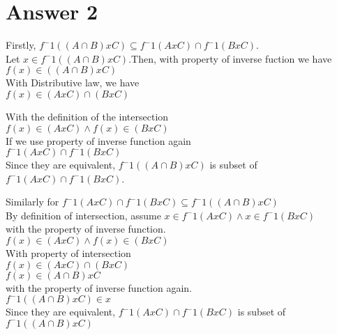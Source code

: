 \documentclass[12pt]{article}
\begin{document}
\section*{Answer 2}

Firstly, $f^-1((A \cap B)xC) \subseteq f^-1(AxC) \cap f^-1(BxC)$. \\

Let $x \in f^-1((A \cap B)xC)$.Then, with property of inverse fuction we have \\


$f(x) \in ((A \cap B)xC)$ \\ 

With Distributive law, we have \\

$f(x) \in (AxC)  \cap (BxC)$ 

With the definition of the intersection \\

$f(x) \in (AxC) \land f(x) \in  (BxC)$ \\


If we use property of inverse function again \\

$f^-1(AxC) \cap f^-1(BxC)$ \\

Since they are equivalent, $f^-1((A \cap B)xC)$ is subset of $f^-1(AxC) \cap f^-1(BxC)$.

Similarly for $f^-1(AxC) \cap f^-1(BxC) \subseteq f^-1((A \cap B)xC)$ \\

By definition of intersection, assume $x \in f^-1(AxC) \land x \in f^-1(BxC)$ \\

with the property of inverse function. \\

$f(x) \in (AxC) \land f(x) \in (BxC)$ \\

With property of intersection \\

$f(x) \in (AxC) \cap (BxC)$ \\

$f(x) \in (A \cap B)x C$ \\

with the property of inverse function again. \\

$f^-1((A \cap B)x C) \in x$ \\

Since they are equivalent, $f^-1(AxC) \cap f^-1(BxC)$ is subset of $f^-1((A \cap B)xC)$
 
\end{document}
